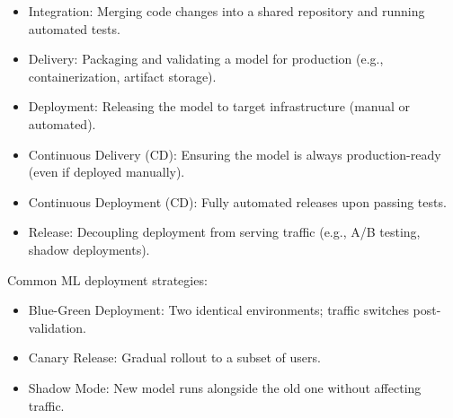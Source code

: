 \begin{itemize}
    \item Integration: Merging code changes into a shared repository and running automated tests.
    \item Delivery: Packaging and validating a model for production (e.g., containerization, artifact storage).
    \item Deployment: Releasing the model to target infrastructure (manual or automated).
    \item Continuous Delivery (CD): Ensuring the model is always production-ready (even if deployed manually).
    \item Continuous Deployment (CD): Fully automated releases upon passing tests.
    \item Release: Decoupling deployment from serving traffic (e.g., A/B testing, shadow deployments).
\end{itemize}
Common ML deployment strategies:
\begin{itemize}
    \item Blue-Green Deployment: Two identical environments; traffic switches post-validation.
    \item Canary Release: Gradual rollout to a subset of users.
    \item Shadow Mode: New model runs alongside the old one without affecting traffic.
\end{itemize}
